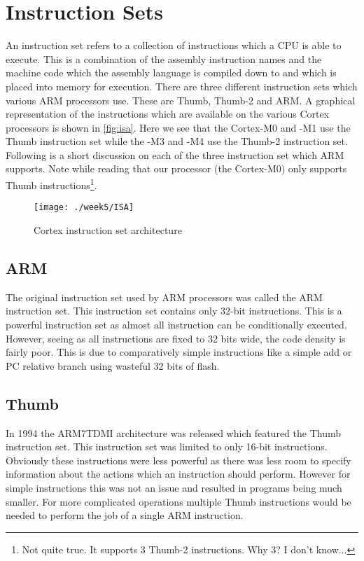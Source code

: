 \chapter{Instruction Sets}
An instruction set refers to a collection of instructions which a CPU is able to execute. This is a combination of the assembly instruction names and the machine code which the assembly language is compiled down to and which is placed into memory for execution. There are three different instruction sets which various ARM processors use. These are Thumb, Thumb-2 and ARM. A graphical representation of the instructions which are available on the various Cortex processors is shown in \autoref{fig:isa}. Here we see that the Cortex-M0 and -M1 use the Thumb instruction set while the -M3 and -M4 use the Thumb-2 instruction set. Following is a short discussion on each of the three instruction set which ARM supports. Note while reading that our processor (the Cortex-M0) only supports Thumb instructions\footnote{Not quite true. It supports 3 Thumb-2 instructions. Why 3? I don't know...}.

\begin{figure}
\centering
\texttt{[image: ./week5/ISA]}
\caption{Cortex instruction set architecture}
\label{fig:isa}
\end{figure}

\section{ARM}
The original instruction set used by ARM processors was called the ARM instruction set. This instruction set contains only 32-bit instructions. This is a powerful instruction set as almost all instruction can be conditionally executed. However, seeing as all instructions are fixed to 32 bits wide, the code density is fairly poor. This is due to comparatively simple instructions like a simple add or PC relative branch using wasteful 32 bits of flash.

\section{Thumb}
In 1994 the ARM7TDMI architecture was released which featured the Thumb instruction set. This instruction set was limited to only 16-bit instructions. Obviously these instructions were less powerful as there was less room to specify information about the actions which an instruction should perform. However for simple instructions this was not an issue and resulted in programs being much smaller. For more complicated operations multiple Thumb instructions would be needed to perform the job of a single ARM instruction. 

